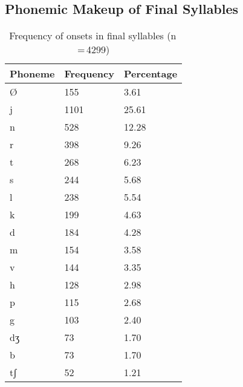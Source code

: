 \subsection{Phonemic Makeup of Final Syllables}

\begin{table}[pth]\centering
\caption[Frequency of onsets in final syllables]{Frequency of onsets in final syllables (n\,=\,4299)}
\setlength{\multicolsep}{0em}
\begin{multicols}{2}
\begin{tabu} to \linewidth{X X[c] X[c]}
\tableheaderfont\toprule
Phoneme
	& Frequency
	& Percentage
	\\
	
\toprule

Ø
	& 155
	& 3.61\pct
	\\

\midrule

j
	& 1101
	& 25.61\pct
	\\

n
	& 528
	& 12.28\pct
	\\

r
	& 398
	& 9.26\pct
	\\

t
	& 268
	& 6.23\pct
	\\

s
	& 244
	& 5.68\pct
	\\

l
	& 238
	& 5.54\pct
	\\

k
	& 199
	& 4.63\pct
	\\

d
	& 184
	& 4.28\pct
	\\

m
	& 154
	& 3.58\pct
	\\

v
	& 144
	& 3.35\pct
	\\

h
	& 128
	& 2.98\pct
	\\

p
	& 115
	& 2.68\pct
	\\

g
	& 103
	& 2.40\pct
	\\

dʒ
	& 73
	& 1.70\pct
	\\

b
	& 73
	& 1.70\pct
	\\

tʃ
	& 52
	& 1.21\pct
	\\


\end{tabu}
\end{multicols}
\end{table}
